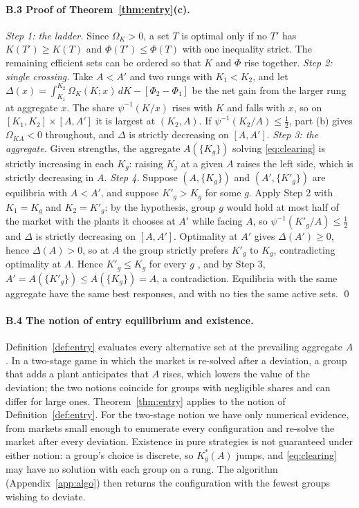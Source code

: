 \documentclass[11pt]{article}
\theoremstyle{definition}
\theoremstyle{remark}
\begin{document}
\paragraph{B.3 Proof of Theorem~\ref{thm:entry}(c).} \emph{Step 1: the ladder.} Since
$\Omega_K>0$, a set $T$ is optimal only if no $T'$ has $K(T')\ge K(T)$ and
$\Phi(T')\le\Phi(T)$ with one inequality strict. The remaining efficient sets can be
ordered so that $K$ and $\Phi$ rise together. \emph{Step 2: single crossing.} Take
$A<A'$ and two rungs with $K_1<K_2$, and let
$\Delta(x)=\int_{K_1}^{K_2}\Omega_K(K;x)\,dK-[\Phi_2-\Phi_1]$ be the net gain from the
larger rung at aggregate $x$. The share $\psi^{-1}(K/x)$ rises with $K$ and falls with
$x$, so on $[K_1,K_2]\times[A,A']$ it is largest at $(K_2,A)$. If
$\psi^{-1}(K_2/A)\le\frac12$, part (b) gives $\Omega_{KA}<0$ throughout, and $\Delta$
is strictly decreasing on $[A,A']$. \emph{Step 3: the aggregate.} Given strengths, the
aggregate $A(\{K_g\})$ solving \eqref{eq:clearing} is strictly increasing in each $K_g$:
raising $K_j$ at a given $A$ raises the left side, which is strictly decreasing in $A$.
\emph{Step 4.} Suppose $(A,\{K_g\})$ and $(A',\{K'_g\})$ are equilibria with $A<A'$,
and suppose $K'_g>K_g$ for some $g$. Apply Step 2 with $K_1=K_g$ and $K_2=K'_g$: by the
hypothesis, group $g$ would hold at most half of the market with the plants it chooses
at $A'$ while facing $A$, so $\psi^{-1}(K'_g/A)\le\frac12$ and $\Delta$ is strictly
decreasing on $[A,A']$. Optimality at $A'$ gives $\Delta(A')\ge0$, hence $\Delta(A)>0$,
so at $A$ the group strictly prefers $K'_g$ to $K_g$, contradicting optimality at $A$.
Hence $K'_g\le K_g$ for every $g$ \citep[the single-crossing argument of][]{MilgromShannon1994},
and by Step 3, $A'=A(\{K'_g\})\le A(\{K_g\})=A$, a contradiction. Equilibria with the
same aggregate have the same best responses, and with no ties the same active sets.
\qed

\paragraph{B.4 The notion of entry equilibrium and existence.}
\label{app:nash}
Definition~\ref{def:entry} evaluates every alternative set at the prevailing aggregate
$A$. In a two-stage game in which the market is re-solved after a deviation, a group
that adds a plant anticipates that $A$ rises, which lowers the value of the deviation;
the two notions coincide for groups with negligible shares and can differ for large
ones. Theorem~\ref{thm:entry} applies to the notion of Definition~\ref{def:entry}. For
the two-stage notion we have only numerical evidence, from markets small enough to
enumerate every configuration and re-solve the market after every deviation. Existence
in pure strategies is not guaranteed under either notion: a group's choice is discrete,
so $K^*_g(A)$ jumps, and \eqref{eq:clearing} may have no solution with each group on
a rung. The algorithm (Appendix~\ref{app:algo}) then returns the configuration with the
fewest groups wishing to deviate.
\end{document}
